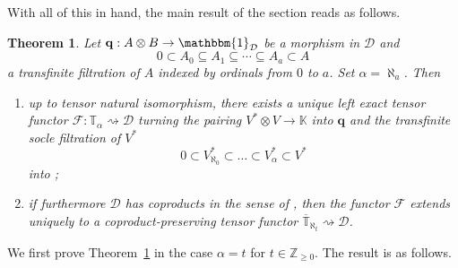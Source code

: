 \documentclass[11pt]{article}
\renewcommand{\labelenumi}{(\arabic{enumi})}
\theoremstyle{plain}
\newtheorem{theorem}[lemma]{Theorem}
\theoremstyle{nonumberplain}
\theoremstyle{plain}
\theoremstyle{nonumberplain}
\newcommand\bK{\mathbb K}
\newcommand\bT{\mathbb T}
\newcommand\cD{\mathcal D}
\begin{document}
With all of this in hand, the main result of the section reads as
follows.





\begin{theorem}\label{th.univ-gen}
  Let
  $\mathbf{q}:A\otimes B\to \mathbbm{1}_\cD$ be a morphism in $\cD$ and
  \begin{equation}\label{eq:filt-x-gen}
    0\subset A_0\subseteq A_1\subseteq  \cdots \subseteq A_a\subset A
  \end{equation}
  a transfinite filtration of $A$ indexed by ordinals from $0$ to $a$.  Set $\alpha=\aleph_a$.  Then
\begin{enumerate}
\renewcommand{\labelenumi}{(\alph{enumi})}
\item up to tensor natural isomorphism, there exists a unique left
  exact tensor functor $\mathcal{F}:\bT_{\alpha} \rightsquigarrow \cD$ turning the pairing
  $V^*\otimes V\to \bK$ into $\mathbf{q}$ and the transfinite socle filtration of $V^*$
  \begin{equation*}
    0\subset V^*_{\aleph_0}\subset \ldots \subset V^*_\alpha \subset V^*
  \end{equation*}
  into ;
\item if furthermore $\cD$ has coproducts in the sense of
  , then the functor $\mathcal{F}$ extends uniquely to a
  coproduct-preserving tensor functor
  $\overline{\bT}_{\aleph_t}  \rightsquigarrow \cD$.
\end{enumerate}
\end{theorem}



%
%
%
%
%
%
%
%
%
%
%
%
%
%
%
%
%
%
%
%

We first prove Theorem~\ref{th.univ-gen} in the case $\alpha=t$ for $t\in\mathbb{Z}_{\geq 0}$.  The result is as follows.
\end{document}
